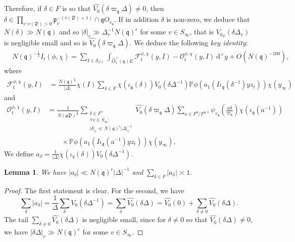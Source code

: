 \documentclass[a4paper,11pt]{amsart}
\newtheorem{lemma}[theorem]{Lemma}
\theoremstyle{definition}
\newcommand{\cl}{\mathcal{C}\ell}
\begin{document}
 Therefore, if $\delta \in F$ is so that $\widehat{V_0}\left(\delta\varpi_\mathfrak{q}\Delta\right)\neq 0$, then $\delta\in \prod_{v:v(\mathfrak{D})>0}\mathfrak{p}_v^{-(v(\mathfrak{D})+1)} \cap \mathfrak{q}O_{v_\mathfrak{q}}$. If in addition $\delta$ is non-zero, we deduce that $N(\delta) \gg N(\mathfrak{q})$ and so $\vert{\delta}\vert_v \gg \Delta_v^{-1}N(\mathfrak{q})^{\epsilon}$ for some $v\in S_{\infty}$, that is ${V_0}_v(\delta\Delta_v)$ is negligible small and so is $\widehat{V_0}\left(\delta \varpi_{\mathfrak{q}}\Delta\right)$.
We deduce the following \emph{key identity}: 
\begin{align}\label{eq:keyidentity}
&N(\mathfrak{q})^{-\frac{1}{2}}I_t(\phi,\chi)= 
    \sum_{I \in \mathcal{S}_{\cl}}\int_{\widehat{O}^{\times}_1(\mathfrak{q})E}\mathcal{F}_t^{\phi,\chi}(y,I) - \mathcal{O}_t^{\phi,\chi}(y,I)\   \mathrm{d}^{\times}y + O(N(\mathfrak{q})^{-100}),
\end{align}
where 
\begin{align}\label{eq:ftphi}
    \mathcal{F}^{\phi,\chi}_t(y,I)&= \frac{N(\mathfrak{q})^{\frac{1}{2}}}{\vert{\Delta}\vert}\chi(I)\sum_{\delta \in F}\overline{\chi}(\iota_{\mathfrak{q}}(\delta))V_0(\delta \Delta^{-1})\mathbb{P}\phi(a_1(I\iota_{\mathfrak{q}}(\delta^{-1})yz_t))\chi(y_{\infty}) 
\end{align} 
and 
\begin{align}\label{eq:otphi}
     \mathcal{O}^{\phi,\chi}_t(y,I)&=\frac{1}{N(\mathfrak{qD})^{\frac{1}{2}}}\sum_{\substack{\delta \in F^{\times}\\\forall v \in S_{\infty}:\\\vert{\delta}\vert_v\ll N(\mathfrak{q})^{\epsilon}\vert{\Delta}\vert_v^{-1} }}\widehat{V_0}\left(\delta\varpi_\mathfrak{q}\Delta\right)\sum_{a\in F^{\mathfrak{q}}/F^{\mathfrak{q},1}}\psi_{v_{\mathfrak{q}}}\left(\frac{a\delta}{\varpi_{\mathfrak{q}}}\right)\chi(\iota_{\mathfrak{q}}(a^{-1})) \nonumber\\&\qquad\times\mathbb{P}\phi(a_1(I\iota_\mathfrak{q}(a^{-1})yz_t))\chi(y_{\infty}),
\end{align}
We define $a_{\delta} = \frac{1}{\vert{\Delta}\vert}\overline{\chi}(\iota_{q}(\delta))V_0(\delta\Delta^{-1})$.
\begin{lemma}
    We have $\vert{a_{\delta}}\vert \ll N(\mathfrak{q})^{\epsilon}\vert{\Delta}\vert^{-1}$ and $\sum_{\delta \in F}\vert{a}_{\delta}\vert \asymp 1$.
\end{lemma}
\begin{proof}
    The first statement is clear. For the second, we have 
    \[\sum_{\delta}\vert{a_{\delta}}\vert = \frac{1}{\Delta}\sum_{\delta}V_0(\delta \Delta^{-1}) = \sum_{\delta}\widehat{V_0}(\delta\Delta) = \widehat{V_0}(0) + \sum_{\delta\neq 0}\widehat{V_0}(\delta\Delta). \]
    The tail $\sum_{\delta\neq 0}\widehat{V_0}(\delta\Delta)$ is negligible small, since for $\delta \neq 0$ so that $\widehat{V_0}(\delta\Delta )\neq0$, we have $\vert{\delta\Delta}\vert_v\gg N(\mathfrak{q})^{\epsilon}$ for some $v\in S_{\infty}$.
\end{proof}
\end{document}

